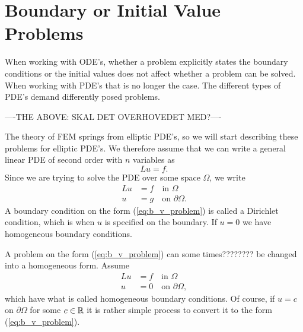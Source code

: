 \section{Boundary or Initial Value Problems}
When working with ODE's,
whether a problem explicitly states the boundary conditions 
or the initial values does not affect whether a problem can be solved.
When working with 
PDE's that is no longer the case. The different types 
of PDE's demand differently posed problems. 


----THE ABOVE: SKAL DET OVERHOVEDET MED?----


The theory of FEM springs from elliptic PDE's, so we will start 
describing these problems for elliptic PDE's.
We therefore assume that we can write a general linear PDE of second 
order with $n$ variables as 
\begin{equation*}
    Lu = f.
\end{equation*}
Since we are trying to solve the PDE over some space $\Omega$, we write
\begin{align}
    Lu &= f \quad \text{in } \Omega \label{eq:b_v_problem} \\
    u &= g \quad \text{on } \partial \Omega. \nonumber
\end{align}
A boundary condition on the form (\ref{eq:b_v_problem}) is called a 
Dirichlet condition, which is when $u$ is specified on the boundary. 
If $u=0$ we have homogeneous boundary conditions.

A problem on the form (\ref{eq:b_v_problem}) can some times???????? 
be changed into a homogeneous form. Assume 
\begin{align}
    Lu &= f \quad \text{in } \Omega \label{eq:b_v_problem} \\
    u &= 0 \quad \text{on } \partial \Omega, \nonumber
\end{align}
which have what is called homogeneous boundary conditions. Of course, 
if $u=c$ on $\partial \Omega$ for some $c \in \mathbb{R}$ it is 
rather simple process to convert it to the form (\ref{eq:b_v_problem}).